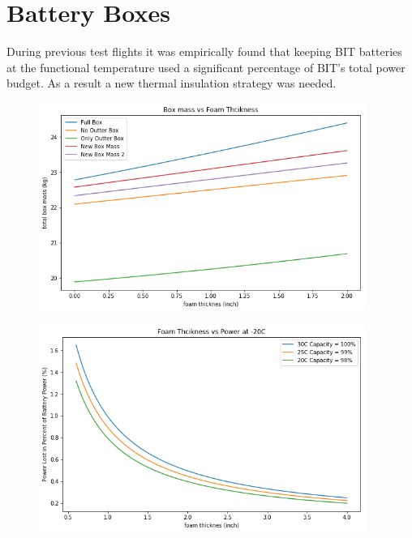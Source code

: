 \section{Battery Boxes}
During previous test flights it was empirically found that keeping BIT batteries at the functional temperature used a significant percentage of BIT's total power budget. As a result a new thermal insulation strategy was needed. 

\begin{figure}
    \begin{small}
        \begin{center}
            \includegraphics[width=0.95\textwidth]{Hardware/figs/battery_box_mass.png}
        \end{center}
        \caption{}
        \label{fig:}
    \end{small}
\end{figure}

\begin{figure}
    \begin{small}
        \begin{center}
            \includegraphics[width=0.95\textwidth]{Hardware/figs/battery_power_loss.png}
        \end{center}
        \caption{}
        \label{fig:}
    \end{small}
\end{figure}


